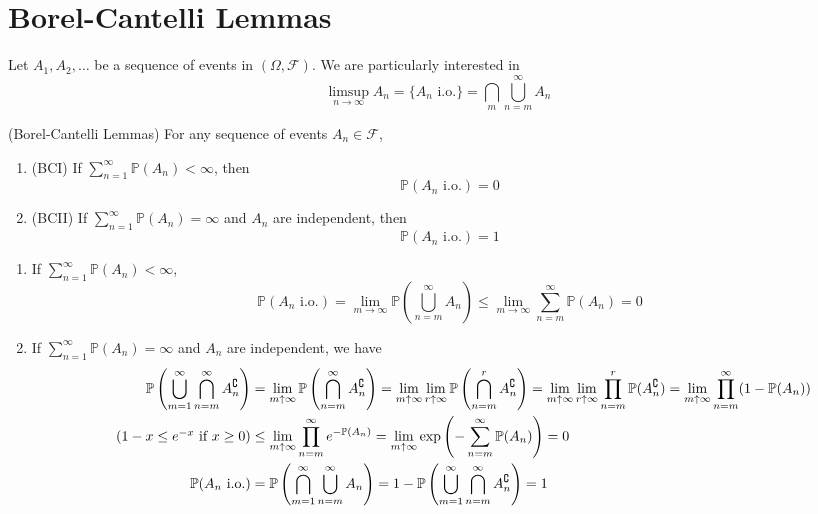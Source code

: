 \documentclass{huhtakm-template-book}
\newcommand{\prob}{\mathbb{P}}
\begin{document}
\section{Borel-Cantelli Lemmas}
    Let $A_{1},A_{2},\dots$ be a sequence of events in $(\Omega,\mathcal{F})$. We are particularly interested in
    \begin{equation*}
        \limsup_{n\to\infty}A_{n}=\{A_{n}\text{ i.o.}\}=\bigcap_{m}\bigcup_{n=m}^{\infty} A_{n}
    \end{equation*}
    \begin{thm}(Borel-Cantelli Lemmas)
        For any sequence of events $A_{n}\in\mathcal{F}$,
        \begin{enumerate}
            \item (BCI) If $\sum_{n=1}^{\infty}\prob(A_{n})<\infty$, then
            \begin{equation*}
                \prob(A_{n}\text{ i.o.})=0
            \end{equation*}
            \item (BCII) If $\sum_{n=1}^{\infty}\prob(A_{n})=\infty$ and $A_{n}$ are independent, then
            \begin{equation*}
                \prob(A_{n}\text{ i.o.})=1
            \end{equation*}
        \end{enumerate}
    \end{thm}
    \begin{proofing}
        \begin{enumerate}
            \item If $\sum_{n=1}^{\infty}\prob(A_{n})<\infty$,
            \begin{equation*}
                \prob(A_{n}\text{ i.o.})=\lim_{m\to\infty}\prob\left(\bigcup_{n=m}^{\infty}A_{n}\right)\leq\lim_{m\to\infty}\sum_{n=m}^{\infty}\prob(A_{n})=0
            \end{equation*}
            \item If $\sum_{n=1}^{\infty}\prob(A_{n})=\infty$ and $A_{n}$ are independent, we have
            \begin{align*}
                \prob\left(\bigcup_{m=1}^{\infty}\bigcap_{n=m}^{\infty}A_{n}^{\complement}\right)&=\lim_{m\uparrow\infty}\prob\left(\bigcap_{n=m}^{\infty}A_{n}^{\complement}\right)=\lim_{m\uparrow\infty}\lim_{r\uparrow\infty}\prob\left(\bigcap_{n=m}^{r}A_{n}^{\complement}\right)=\lim_{m\uparrow\infty}\lim_{r\uparrow\infty}\prod_{n=m}^{r}\prob(A_{n}^{\complement})=\lim_{m\uparrow\infty}\prod_{n=m}^{\infty}(1-\prob(A_{n}))\\
                \tag{$1-x\leq e^{-x}$ if $x\geq 0$}
                &\leq\lim_{m\uparrow\infty}\prod_{n=m}^{\infty}e^{-\prob(A_{n})}=\lim_{m\uparrow\infty}\exp\left(-\sum_{n=m}^{\infty}\prob(A_{n})\right)=0\\
                \prob(A_{n}\text{ i.o.})&=\prob\left(\bigcap_{m=1}^{\infty}\bigcup_{n=m}^{\infty}A_{n}\right)=1-\prob\left(\bigcup_{m=1}^{\infty}\bigcap_{n=m}^{\infty}A_{n}^{\complement}\right)=1
            \end{align*}
        \end{enumerate}
    \end{proofing}
\end{document}
